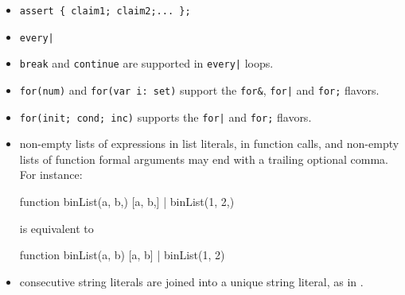 \begin{itemize}
\item \lstinline|assert { claim1; claim2;... };|

\item \lstinline{every|}

\item \lstinline|break| and \lstinline|continue| are supported in
  \lstinline{every|} loops.

\item \lstinline|for(num)| and \lstinline|for(var i: set)| support the
  \lstinline|for&|, \lstinline{for|} and \lstinline|for;| flavors.

\item \lstinline|for(init; cond; inc)| supports the \lstinline{for|}
  and \lstinline|for;| flavors.

\item non-empty lists of expressions in list literals, in function calls,
  and non-empty lists of function formal arguments may end with a
  trailing optional comma.  For instance:

\begin{urbiunchecked}
function binList(a, b,) { [a, b,] } | binList(1, 2,)
\end{urbiunchecked}

  \noindent
  is equivalent to

\begin{urbiunchecked}
function binList(a, b) { [a, b] } | binList(1, 2)
\end{urbiunchecked}

\item consecutive string literals are joined into a unique string
  literal, as in \Cxx.
\end{itemize}

